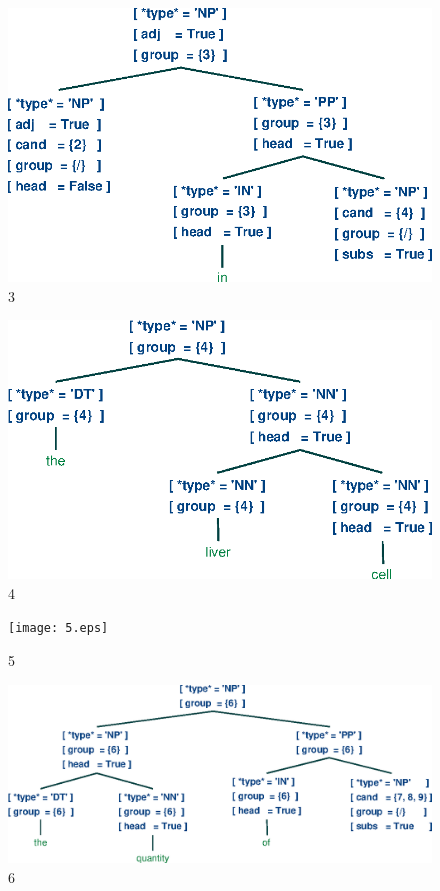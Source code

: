 \documentclass[a4paper]{article}
\begin{document}
\begin{figure}[h]
    \begin{center}
        \includegraphics[scale=0.5]{3.eps}
    \end{center}
    \caption{3}
\end{figure}
\begin{figure}[h]
    \begin{center}
        \includegraphics[scale=0.5]{4.eps}
    \end{center}
    \caption{4}
\end{figure}
\begin{figure}[h]
    \begin{center}
        \texttt{[image: 5.eps]}
    \end{center}
    \caption{5}
\end{figure}
\begin{figure}[h]
    \begin{center}
        \includegraphics[scale=0.5]{6.eps}
    \end{center}
    \caption{6}
\end{figure}
\end{document}
